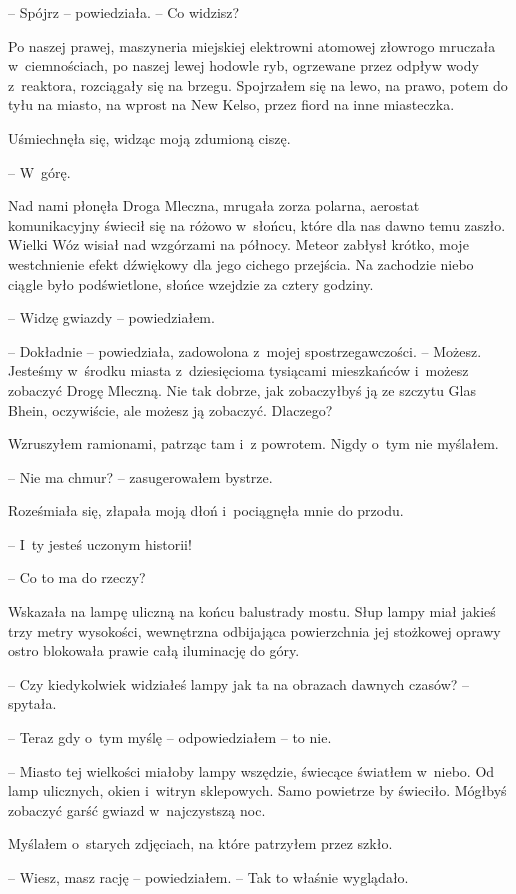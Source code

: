 \documentclass[oneside,polish,11pt,sfheadings]{mwbk}
\begin{document}
-- Spójrz -- powiedziała. -- Co widzisz?

Po naszej prawej, maszyneria miejskiej elektrowni atomowej złowrogo
mruczała w~ciemnościach, po naszej lewej hodowle ryb, ogrzewane przez
odpływ wody z~reaktora, rozciągały się na brzegu. Spojrzałem się na
lewo, na prawo, potem do tyłu na miasto, na wprost na New Kelso, przez
fiord na inne miasteczka.

Uśmiechnęła się, widząc moją zdumioną ciszę.

-- W~górę.

Nad nami płonęła Droga Mleczna, mrugała zorza polarna, aerostat
komunikacyjny świecił się na różowo w~słońcu, które dla nas dawno temu
zaszło. Wielki Wóz wisiał nad wzgórzami na północy. Meteor zabłysł
krótko, moje westchnienie efekt dźwiękowy dla jego cichego przejścia.
Na zachodzie niebo ciągle było podświetlone, słońce wzejdzie za cztery
godziny.

-- Widzę gwiazdy -- powiedziałem.

-- Dokładnie -- powiedziała, zadowolona z~mojej spostrzegawczości. -- Możesz. Jesteśmy w~środku miasta z~dziesięcioma tysiącami mieszkańców i~możesz zobaczyć Drogę Mleczną. Nie tak dobrze, jak zobaczyłbyś ją ze
szczytu Glas Bhein, oczywiście, ale możesz ją zobaczyć. Dlaczego?

Wzruszyłem ramionami, patrząc tam i~z powrotem. Nigdy o~tym nie
myślałem.

-- Nie ma chmur? -- zasugerowałem bystrze.

Roześmiała się, złapała moją dłoń i~pociągnęła mnie do przodu. 

-- I~ty jesteś uczonym historii!

-- Co to ma do rzeczy?

Wskazała na lampę uliczną na końcu balustrady mostu. Słup lampy miał
jakieś trzy metry wysokości, wewnętrzna odbijająca powierzchnia jej
stożkowej oprawy ostro blokowała prawie całą iluminację do góry. 

-- Czy kiedykolwiek widziałeś lampy jak ta na obrazach dawnych czasów? -- spytała.

-- Teraz gdy o~tym myślę -- odpowiedziałem -- to nie.

-- Miasto tej wielkości miałoby lampy wszędzie, świecące światłem w~niebo. Od lamp ulicznych, okien i~witryn sklepowych. Samo powietrze by
świeciło. Mógłbyś zobaczyć garść gwiazd w~najczystszą noc.

Myślałem o~starych zdjęciach, na które patrzyłem przez szkło. 

-- Wiesz, masz rację -- powiedziałem. -- Tak to właśnie wyglądało.
\end{document}
